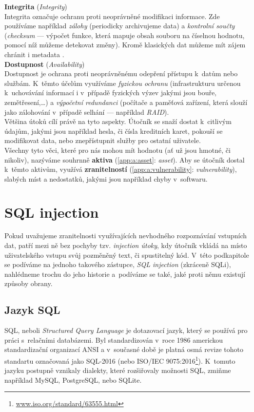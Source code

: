 \textbf{Integrita} (\textit{Integrity}) \\
Integrita označuje ochranu proti neoprávněné modifikaci informace. Zde používáme například \textit{zálohy} (periodicky archivujeme data) 
a \textit{kontrolní součty} (\textit{checksum} --- výpočet funkce, která mapuje obsah souboru na číselnou hodnotu, pomocí níž můžeme detekovat změny). 
Kromě klasických dat můžeme mít zájem chránit i metadata \cite[str. 6-7]{Goodrich2011}. \\

\textbf{Dostupnost} (\textit{Availability}) \\
Dostupnost je ochrana proti neoprávněnému odepření přístupu k~datům nebo službám. K~těmto účelům využíváme 
\textit{fyzickou ochranu} (infrastrukturu určenou k~uchovávání informací i v~případě fyzických výzev jakými jsou bouře, zemětřesení,\dots) 
a \textit{výpočetní redundanci} (počítače a paměťová zařízení, která slouží jako zálohování 
v~případě selhání --- například \textit{RAID})\cite[str. 7]{Goodrich2011}. \\

Většina útoků cílí právě na tyto aspekty. Útočník se snaží dostat k~citlivým údajům, jakými jsou například hesla, či čísla kreditních karet, 
pokouší se modifikovat data, nebo znepřístupnit služby pro ostatní uživatele. \\

Všechny tyto věci, které pro nás mohou mít hodnotu (ať už jsou hmotné, či nikoliv), nazýváme souhrnně \textbf{aktiva} 
(\ref{app:a:asset}: \textit{asset}). Aby se útočník dostal k~těmto aktivům, využívá \textbf{zranitelností} 
(\ref{app:a:vulnerability}: \textit{vulnerability}), slabých míst a nedostatků, jakými jsou například chyby v~softwaru. 

\section{SQL injection} \label{sec:3:sqli}
Pokud uvažujeme zranitelnosti využívajících nevhodného rozpoznávání vstupních dat, patří mezi ně bez pochyby tzv. \textit{injection útoky}, kdy 
útočník vkládá na místo uživatelského vstupu svůj pozměněný text, či spustitelný kód. V~této podkapitole se podíváme na jednoho 
takového zástupce, \textit{SQL injection} (zkráceně SQLi), nahlédneme trochu do jeho historie a~podíváme se také, jaké proti němu existují způsoby obrany. 

\subsection{Jazyk SQL} \label{subsec:3:sql}
SQL, neboli \textit{Structured Query Language} je dotazovací jazyk, který se používá pro práci s~relačními databázemi. Byl standardizován 
v~roce 1986 americkou standardizační organizací ANSI a v~současné době je platná osmá revize tohoto standartu označovaná jako SQL-2016 
(nebo ISO/IEC 9075:2016\footnote{\url{www.iso.org/standard/63555.html}}). K~tomuto jazyku postupně vznikaly dialekty, které rozšiřovaly
možnosti SQL, zmiňme například MySQL, PostgreSQL, nebo SQLite.\\

